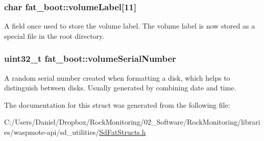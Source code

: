 \subsubsection[{\texorpdfstring{volume\+Label}{volumeLabel}}]{\setlength{\rightskip}{0pt plus 5cm}char fat\+\_\+boot\+::volume\+Label\mbox{[}11\mbox{]}}\hypertarget{structfat__boot_a9ee733f1b1abc0210ec8f9676bba2218}{}\label{structfat__boot_a9ee733f1b1abc0210ec8f9676bba2218}
A field once used to store the volume label. The volume label is now stored as a special file in the root directory. 
\subsubsection[{\texorpdfstring{volume\+Serial\+Number}{volumeSerialNumber}}]{\setlength{\rightskip}{0pt plus 5cm}uint32\+\_\+t fat\+\_\+boot\+::volume\+Serial\+Number}\hypertarget{structfat__boot_ac05e88a0d27f0340ba008834361d2b20}{}\label{structfat__boot_ac05e88a0d27f0340ba008834361d2b20}
A random serial number created when formatting a disk, which helps to distinguish between disks. Usually generated by combining date and time. 

The documentation for this struct was generated from the following file\+:\begin{DoxyCompactItemize}
\item 
C\+:/\+Users/\+Daniel/\+Dropbox/\+Rock\+Monitoring/02\+\_\+\+Software/\+Rock\+Monitoring/libraries/waspmote-\/api/sd\+\_\+utilities/\hyperlink{_sd_fat_structs_8h}{Sd\+Fat\+Structs.\+h}\end{DoxyCompactItemize}
